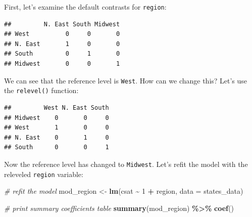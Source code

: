 \documentclass[
]{book}
\newenvironment{Shaded}{\begin{snugshade}}{\end{snugshade}}
\newcommand{\CommentTok}[1]{\textcolor[rgb]{0.56,0.35,0.01}{\textit{#1}}}
\newcommand{\DataTypeTok}[1]{\textcolor[rgb]{0.13,0.29,0.53}{#1}}
\newcommand{\DecValTok}[1]{\textcolor[rgb]{0.00,0.00,0.81}{#1}}
\newcommand{\KeywordTok}[1]{\textcolor[rgb]{0.13,0.29,0.53}{\textbf{#1}}}
\newcommand{\NormalTok}[1]{#1}
\newcommand{\OperatorTok}[1]{\textcolor[rgb]{0.81,0.36,0.00}{\textbf{#1}}}
\newcommand{\StringTok}[1]{\textcolor[rgb]{0.31,0.60,0.02}{#1}}
\begin{document}
First, let's examine the default contrasts for \texttt{region}:

\begin{Shaded}
\end{Shaded}

\begin{verbatim}
##         N. East South Midwest
## West          0     0       0
## N. East       1     0       0
## South         0     1       0
## Midwest       0     0       1
\end{verbatim}

We can see that the reference level is \texttt{West}. How can we change this? Let's use the \texttt{relevel()} function:

\begin{Shaded}
\end{Shaded}

\begin{verbatim}
##         West N. East South
## Midwest    0       0     0
## West       1       0     0
## N. East    0       1     0
## South      0       0     1
\end{verbatim}

Now the reference level has changed to \texttt{Midwest}. Let's refit the model with the releveled \texttt{region} variable:

\begin{Shaded}
\begin{Highlighting}[]
  \CommentTok{\# refit the model}
\NormalTok{  mod\_region \textless{}{-}}\StringTok{ }\KeywordTok{lm}\NormalTok{(csat }\OperatorTok{\textasciitilde{}}\StringTok{ }\DecValTok{1} \OperatorTok{+}\StringTok{ }\NormalTok{region, }\DataTypeTok{data =}\NormalTok{ states\_data)}

  \CommentTok{\# print summary coefficients table}
  \KeywordTok{summary}\NormalTok{(mod\_region) }\OperatorTok{\%\textgreater{}\%}\StringTok{ }\KeywordTok{coef}\NormalTok{()}
\end{Highlighting}
\end{Shaded}
\end{document}
